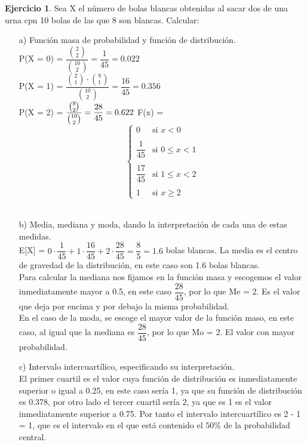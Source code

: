\documentclass[a4paper, 12pt]{article}
\theoremstyle{definition}
\newtheorem{ej}{Ejercicio}
\begin{document}
\newpage

\begin{ej}
Sea X el número de bolas blancas obtenidas al sacar dos de una urna cpn 10 bolas de las que 8 son blancas. Calcular:
\begin{enumerate}
    \item[a) ] Función masa de probabilidad y función de distribución.\\
    P(X = 0) = $\dfrac{{2 \choose 2}}{{10 \choose 2}} = \dfrac{1}{45} = 0.022$\\
    P(X = 1) = $\dfrac{{2 \choose 1} \cdot {8 \choose 1}}{{10 \choose 2}} = \dfrac{16}{45} = 0.356$ \\ 
    P(X = 2) = $\dfrac{{8 \choose 2}}{{10 \choose 2}} = \dfrac{28}{45} = 0.622 \\$
    F(x) = $$\left\{
     \begin{array}{lr}
       0 & \mbox{si }  x < 0 \\
       \\
       \dfrac{1}{45} & \mbox{si }0 \leq x < 1 \\
       \\
       \dfrac{17}{45}& \mbox{si }  1 \leq x < 2 \\
       \\
       1 & \mbox{si } x \geq 2
     \end{array}
   \right.
    $$
\\
\item[b) ] Media, mediana y moda, dando la interpretación de cada una de estas medidas. \\
E[X] = $0 \cdot \dfrac{1}{45} + 1 \cdot \dfrac{16}{45} + 2 \cdot \dfrac{28}{45} = \dfrac{8}{5} = 1.6$ bolas blancas. La media es el centro de gravedad de la distribución, en este caso son 1.6 bolas blancas.
\\
Para calcular la mediana nos fijamos en la función masa y escogemos el valor inmediatamente mayor a 0.5, en este caso $\dfrac{28}{45}$, por lo que Me = 2. Es el valor que deja por encima y por debajo la misma probabilidad.
\\
En el caso de la moda, se escoge el mayor valor de la función maso, en este caso, al igual que la mediana es $\dfrac{28}{45}$, por lo que Mo = 2. El valor con mayor probabilidad.\\
\item[c) ] Intervalo intercuartílico, especificando su interpretación. \\
El primer cuartil es el valor cuya función de distribución es inmediatamente superior o igual a 0.25, en este caso sería 1, ya que su función de distribución es 0.378, por otro lado el tercer cuartil sería 2, ya que es 1 es el valor inmediatamente superior a 0.75. Por tanto el intervalo intercuartílico es 2 - 1 = 1, que es el intervalo en el que está contenido el $50\%$ de la probabilidad central.

\end{enumerate}

\end{ej}
\end{document}
